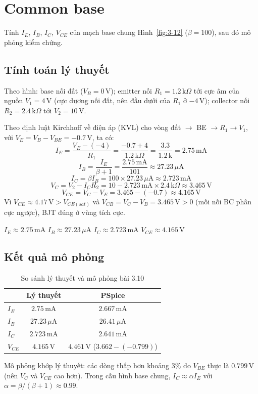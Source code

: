 \section{Common base}
Tính $I_E$, $I_B$, $I_C$, $V_{CE}$ của mạch base chung Hình~\ref{fig:3-12} ($\beta = 100$), sau đó mô phỏng kiểm chứng.


\subsection{Tính toán lý thuyết}
Theo hình: base nối đất ($V_B = 0\,\text{V}$); emitter nối $R_1 = 1.2\,\text{k}\Omega$ tới cực âm của nguồn $V_1 = 4\,\text{V}$ (cực dương nối đất, nên đầu dưới của $R_1$ ở $-4\,\text{V}$); collector nối $R_2 = 2.4\,\text{k}\Omega$ tới $V_2 = 10\,\text{V}$.

Theo định luật Kirchhoff về điện áp (KVL) cho vòng đất $\to$ BE $\to R_1 \to V_1$, với $V_E = V_B - V_{BE} = -0.7\,\text{V}$, ta có:
\[ I_E = \frac{V_E - (-4)}{R_1} = \frac{-0.7 + 4}{1.2\,\text{k}\Omega} = \frac{3.3}{1.2\,\text{k}} = 2.75\,\text{mA} \]
\[ I_B = \frac{I_E}{\beta + 1} = \frac{2.75\,\text{mA}}{101} \approx 27.23\,\mu\text{A} \]
\[ I_C = \beta I_B = 100\times 27.23\,\mu\text{A} \approx 2.723\,\text{mA} \]
\[ V_C = V_2 - I_C R_2 = 10 - 2.723\,\text{mA}\times 2.4\,\text{k}\Omega \approx 3.465\,\text{V} \]
\[ V_{CE} = V_C - V_E = 3.465 - (-0.7) \approx 4.165\,\text{V} \]
Vì $V_{CE} \approx 4.17\,\text{V} > V_{CE(sat)}$ và $V_{CB} = V_C - V_B = 3.465\,\text{V} > 0$ (mối nối BC phân cực ngược), BJT đúng ở vùng tích cực.

\begin{dapsobox}
$I_E \approx 2.75\,\text{mA}$ \quad $I_B \approx 27.23\,\mu\text{A}$ \quad $I_C \approx 2.723\,\text{mA}$ \quad $V_{CE} \approx 4.165\,\text{V}$
\end{dapsobox}

\subsection{Kết quả mô phỏng}

\begin{table}[H]
\centering
\begin{tabular}{l|c|c}
\toprule
 & Lý thuyết & PSpice \\
\midrule
$I_E$ & $2.75\,\text{mA}$ & $2.667\,\text{mA}$ \\
$I_B$ & $27.23\,\mu\text{A}$ & $26.41\,\mu\text{A}$ \\
$I_C$ & $2.723\,\text{mA}$ & $2.641\,\text{mA}$ \\
$V_{CE}$ & $4.165\,\text{V}$ & $4.461\,\text{V}$ ($3.662 - (-0.799)$) \\
\bottomrule
\end{tabular}
\caption{So sánh lý thuyết và mô phỏng bài 3.10}
\end{table}

Mô phỏng khớp lý thuyết: các dòng thấp hơn khoảng $3\%$ do $V_{BE}$ thực là $0.799\,\text{V}$ (nên $V_C$ và $V_{CE}$ cao hơn). Trong cấu hình base chung, $I_C \approx \alpha I_E$ với $\alpha = \beta/(\beta+1) \approx 0.99$.
